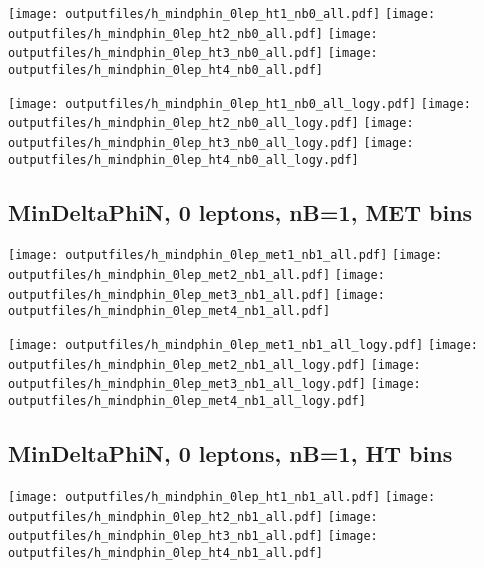 \documentclass[11pt]{article}
\begin{document}
    \noindent
     \texttt{[image: outputfiles/h\_mindphin\_0lep\_ht1\_nb0\_all.pdf]}
     \texttt{[image: outputfiles/h\_mindphin\_0lep\_ht2\_nb0\_all.pdf]}
     \texttt{[image: outputfiles/h\_mindphin\_0lep\_ht3\_nb0\_all.pdf]}
     \texttt{[image: outputfiles/h\_mindphin\_0lep\_ht4\_nb0\_all.pdf]}

    \noindent
     \texttt{[image: outputfiles/h\_mindphin\_0lep\_ht1\_nb0\_all\_logy.pdf]}
     \texttt{[image: outputfiles/h\_mindphin\_0lep\_ht2\_nb0\_all\_logy.pdf]}
     \texttt{[image: outputfiles/h\_mindphin\_0lep\_ht3\_nb0\_all\_logy.pdf]}
     \texttt{[image: outputfiles/h\_mindphin\_0lep\_ht4\_nb0\_all\_logy.pdf]}

    \clearpage


    \subsection{ MinDeltaPhiN, 0 leptons, nB=1, MET bins }

    \noindent
     \texttt{[image: outputfiles/h\_mindphin\_0lep\_met1\_nb1\_all.pdf]}
     \texttt{[image: outputfiles/h\_mindphin\_0lep\_met2\_nb1\_all.pdf]}
     \texttt{[image: outputfiles/h\_mindphin\_0lep\_met3\_nb1\_all.pdf]}
     \texttt{[image: outputfiles/h\_mindphin\_0lep\_met4\_nb1\_all.pdf]}

    \noindent
     \texttt{[image: outputfiles/h\_mindphin\_0lep\_met1\_nb1\_all\_logy.pdf]}
     \texttt{[image: outputfiles/h\_mindphin\_0lep\_met2\_nb1\_all\_logy.pdf]}
     \texttt{[image: outputfiles/h\_mindphin\_0lep\_met3\_nb1\_all\_logy.pdf]}
     \texttt{[image: outputfiles/h\_mindphin\_0lep\_met4\_nb1\_all\_logy.pdf]}

    \clearpage



    \subsection{ MinDeltaPhiN, 0 leptons, nB=1, HT bins }

    \noindent
     \texttt{[image: outputfiles/h\_mindphin\_0lep\_ht1\_nb1\_all.pdf]}
     \texttt{[image: outputfiles/h\_mindphin\_0lep\_ht2\_nb1\_all.pdf]}
     \texttt{[image: outputfiles/h\_mindphin\_0lep\_ht3\_nb1\_all.pdf]}
     \texttt{[image: outputfiles/h\_mindphin\_0lep\_ht4\_nb1\_all.pdf]}
\end{document}
